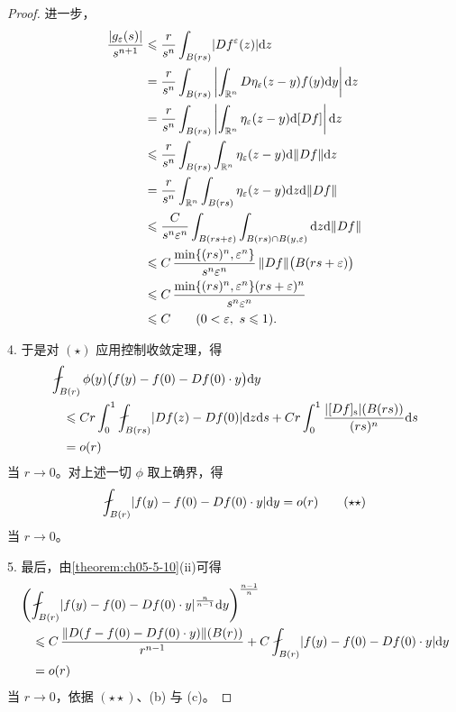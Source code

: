 \documentclass[../../main.tex]{subfiles}%
\begin{document}
\begin{proof}
进一步，
\begin{align*}
\frac{\lvert g_\varepsilon(s)\rvert}{s^{n+1}}
&\leqslant\frac{r}{s^n}\int_{B(rs)}\lvert Df^\varepsilon(z)\rvert\mathrm{d} z\\
&=\frac{r}{s^n}\int_{B(rs)}\left\lvert\int_{\mathbb{R}^n}D\eta_\varepsilon(z-y)f(y)\mathrm{d} y\right\rvert\mathrm{d} z\\
&=\frac{r}{s^n}\int_{B(rs)}\left\lvert\int_{\mathbb{R}^n}\eta_\varepsilon(z-y)\mathrm{d}[Df]\right\rvert\mathrm{d} z\\
&\leqslant\frac{r}{s^n}\int_{B(rs)}\int_{\mathbb{R}^n}\eta_\varepsilon(z-y)\mathrm{d}\lVert Df\rVert\mathrm{d} z\\
&=\frac{r}{s^n}\int_{\mathbb{R}^n}\int_{B(rs)}\eta_\varepsilon(z-y)\mathrm{d} z\mathrm{d}\lVert Df\rVert\\
&\leqslant\frac{C}{s^n\varepsilon^n}\int_{B(rs+\varepsilon)}\int_{B(rs)\cap B(y,\varepsilon)}\mathrm{d} z\mathrm{d}\lVert Df\rVert\\
&\leqslant C\,\frac{\min\{(rs)^n,\varepsilon^n\}}{s^n\varepsilon^n}\,\lVert Df\rVert\bigl(B(rs+\varepsilon)\bigr)\\
&\leqslant C\,\frac{\min\{(rs)^n,\varepsilon^n\}(rs+\varepsilon)^n}{s^n\varepsilon^n}\\
&\leqslant C\qquad(0<\varepsilon,\ s\leqslant1).
\end{align*}

4. 于是对 $(\star)$ 应用控制收敛定理，得
\begin{align*}
&\fint_{B(r)}\phi(y)\bigl(f(y)-f(0)-Df(0)\cdot y\bigr)\diff y\\
&\quad\leqslant Cr\int_0^1\fint_{B(rs)}\lvert Df(z)-Df(0)\rvert\diff z\diff s+Cr\int_0^1\frac{\lvert[Df]_{\mathrm{s}}\rvert(B(rs))}{(rs)^n}\diff s\\
&\quad=o(r)
\end{align*}
当 $r\to0$。对上述一切 $\phi$ 取上确界，得
\begin{align*}
\fint_{B(r)}\lvert f(y)-f(0)-Df(0)\cdot y\rvert\diff y=o(r)\qquad(\star\star)
\end{align*}
当 $r\to0$。

5. 最后，由\cref{theorem:ch05-5-10}(ii)可得%
\begin{align*}
&\left(\fint_{B(r)}\lvert f(y)-f(0)-Df(0)\cdot y\rvert^{\frac{n}{n-1}}\diff y\right)^{\frac{n-1}{n}}\\
&\quad\leqslant C\,\frac{\lVert D(f-f(0)-Df(0)\cdot y)\rVert(B(r))}{r^{n-1}}+C\fint_{B(r)}\lvert f(y)-f(0)-Df(0)\cdot y\rvert\diff y\\
&\quad=o(r)
\end{align*}
当 $r\to0$，依据 $(\star\star)$、(b) 与 (c)。
\end{proof}
\end{document}
